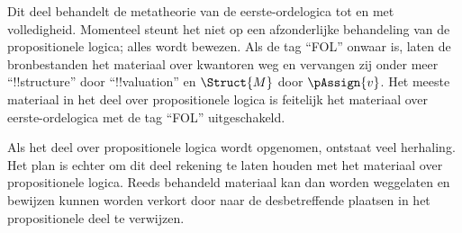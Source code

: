 \documentclass[openany]{memoir}
\begin{document}

\begin{editorial}
  Dit deel behandelt de metatheorie van de eerste-ordelogica tot en met
  volledigheid. Momenteel steunt het niet op een afzonderlijke
  behandeling van de propositionele logica; alles wordt bewezen. Als de
  tag ``FOL'' onwaar is, laten de bronbestanden het materiaal over
  kwantoren weg en vervangen zij onder meer ``!!{structure}'' door
  ``!!{valuation}'' en $\Struct{M}$ door $\pAssign{v}$. Het meeste
  materiaal in het deel over propositionele logica is feitelijk het
  materiaal over eerste-ordelogica met de tag ``FOL'' uitgeschakeld.

  Als het deel over propositionele logica wordt opgenomen, ontstaat veel
  herhaling. Het plan is echter om dit deel rekening te laten houden met
  het materiaal over propositionele logica. Reeds behandeld materiaal
  kan dan worden weggelaten en bewijzen kunnen worden verkort door naar
  de desbetreffende plaatsen in het propositionele deel te verwijzen.
\end{editorial}









\endgroup

\begingroup
\def\olfilename{OLP-0139}
\def\olfilepath{content/first-order-logic/introduction/}
\hypertarget{unit-OLP-0139}{}



\endgroup

\begingroup
\def\olfilename{OLP-0140}
\def\olfilepath{content/first-order-logic/introduction/}
\hypertarget{unit-OLP-0140}{}
\end{document}
